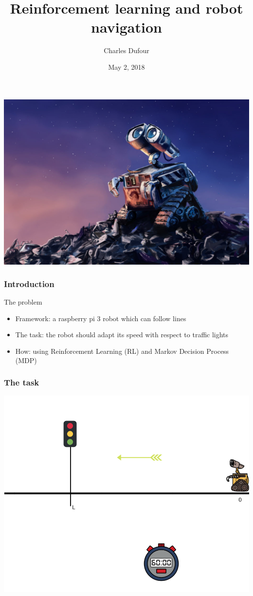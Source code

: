 \documentclass[dvipsnames,svgnames]{beamer}
\author{Charles Dufour}
\title{Reinforcement learning and robot navigation }
\institute{Supervisors: Prof. F. Eisenbrand, Jonas Racine}
\date{May 2, 2018}
\begin{document}
\begin{frame}
\titlepage
\centering
\includegraphics[scale=1]{img/Wall-E.jpg}
\end{frame}




\begin{frame}
\frametitle{Introduction}
\begin{block}{The problem}

  \begin{itemize}
   \item Framework: a raspberry pi 3 robot which can follow lines
   \item The task: the robot should adapt its speed with respect to traffic lights
   \item How: using Reinforcement Learning (RL) and Markov Decision Process (MDP)  
  \end{itemize}
\end{block} 
\end{frame}

\begin{frame}
\frametitle{The task}
\begin{center}
\includegraphics[scale=0.4]{img/illustration_traffic_light.png}
\end{center}
\end{frame}
\end{document}

